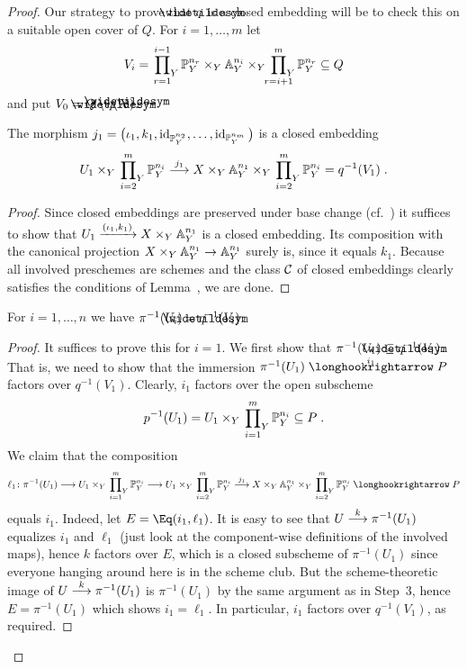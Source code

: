 \documentclass[a4paper,parskip=half,numbers=enddot, DIV=12]{scrreprt}
\begin{document}
\begin{proof}
	Our strategy to prove that $\snake{q}$ is a closed embedding will be to check this on a suitable open cover of $Q$. For $i=1,\ldots,m$ let 
	\begin{align*}
		V_i=\sideset{}{_{Y}}\prod_{r=1}^{i-1}\mathbb{P}_Y^{n_r}\times_Y\mathbb{A}_Y^{n_i}\times_Y\sideset{}{_{Y}}\prod_{r=i+1}^{m}\mathbb{P}_Y^{n_r}\subseteq Q
	\end{align*}
	and put $V_0=Q\setminus \snake{q}(\snake{X})$.
	\begin{lem}
		The morphism $j_1=\big(\iota_1,k_1,\operatorname{id}_{\mathbb{P}_Y^{n_2}},\ldots,\operatorname{id}_{\mathbb{P}_Y^{n_m}}\big)$ is a closed embedding
		\begin{align*}
			U_1\times_Y\fprod{Y}_{i=2}^m\IP_Y^{n_i}\morphism[j_1]X\times_Y\IA_Y^{n_1}\times_Y\fprod{Y}_{i=2}^m\IP_Y^{n_i}=q^{-1}(V_1)\;.
		\end{align*}
	\end{lem}
	\begin{proof}
		Since closed embeddings are preserved under base change (cf.\ \cite[Corollary~1.3.2]{alggeo1}) it suffices to show that $U_1\xrightarrow{(\iota_1,k_1)}X\times_Y\mathbb{A}_Y^{n_1}$ is a closed embedding. Its composition with the canonical projection $X\times_Y\IA_Y^{n_1}\morphism\IA_Y^{n_1}$ surely is, since it equals $k_1$. Because all involved preschemes are schemes and the class $\mathcal{C}$ of closed embeddings clearly satisfies the conditions of Lemma~, we are done.
	\end{proof}
	\begin{lem}
		For $i=1,\ldots,n$ we have $\pi^{-1}(U_i)=\snake{q}^{-1}(V_i)$.
	\end{lem}
	\begin{proof}
		It suffices to prove this for $i=1$. We first show that $\pi^{-1}(U_1)\subseteq \snake{q}^{-1}(V_1)$. That is, we need to show that the immersion $\pi^{-1}(U_1)\monomorphism[i_1] P$ factors over $q^{-1}(V_1)$. Clearly, $i_1$ factors over the open subscheme
		\begin{align*}
			p^{-1}(U_1)=U_1\times_Y\sideset{}{_{Y}}\prod_{i=1}^m\mathbb{P}_Y^{n_i}\subseteq P\;.
		\end{align*}
		We claim that the composition
		\begin{align*}
			\ell_1\colon\pi^{-1}(U_1)\morphism U_1\times_Y\fprod{Y}_{i=1}^m\IP_Y^{n_i}\morphism U_1\times_Y\fprod{Y}_{i=2}^m\IP_Y^{n_i}\morphism[j_1]X\times_Y\IA_Y^{n_1}\times_Y\fprod{Y}_{i=2}^m\IP_Y^{n_i}\monomorphism P
		\end{align*}
		equals $i_1$. Indeed, let $E=\Eq(i_1,\ell_1)$. It is easy to see that $U\morphism[k]\pi^{-1}(U_1)$ equalizes $i_1$ and $\ell_1$ (just look at the component-wise definitions of the involved maps), hence $k$ factors over $E$, which is a closed subscheme of $\pi^{-1}(U_1)$ since everyone hanging around here is in the scheme club. But the scheme-theoretic image of $U\morphism[k]\pi^{-1}(U_1)$ is $\pi^{-1}(U_1)$ by the same argument as in Step~3, hence $E=\pi^{-1}(U_1)$ which shows $i_1=\ell_1$. In particular, $i_1$ factors over $q^{-1}(V_1)$, as required.
		

\end{proof}
\end{proof}
\end{document}
